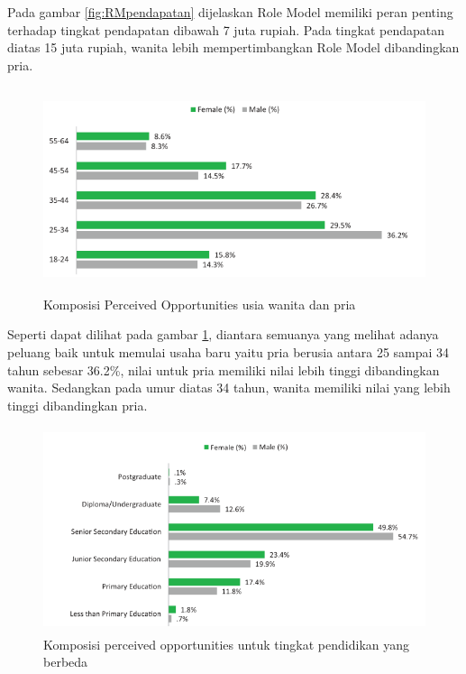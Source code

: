 Pada gambar \ref{fig:RMpendapatan} dijelaskan Role Model memiliki peran penting terhadap tingkat pendapatan dibawah 7 juta rupiah. Pada tingkat pendapatan diatas 15 juta rupiah, wanita lebih mempertimbangkan Role Model dibandingkan pria.

\begin{figure} [H]
	\centering  
	\includegraphics[width=12cm, height=6cm]{umurPO2013} 
	\caption[Komposisi Perceived Opportunities usia wanita dan pria]{Komposisi Perceived Opportunities usia wanita dan pria} 
	\label{fig:POUmur} 
\end{figure} 

Seperti dapat dilihat pada gambar \ref{fig:POUmur}, diantara semuanya yang melihat adanya peluang baik untuk memulai usaha baru yaitu pria berusia antara 25 sampai 34 tahun sebesar 36.2\%, nilai untuk pria memiliki nilai lebih tinggi dibandingkan wanita. Sedangkan pada umur diatas 34 tahun, wanita memiliki nilai yang lebih tinggi dibandingkan pria.

\begin{figure} [H]
	\centering  
	\includegraphics[width=14cm, height=6cm]{pendidikanPO2013} 
	\caption[Komposisi perceived opportunities untuk tingkat pendidikan yang berbeda]{Komposisi perceived opportunities untuk tingkat pendidikan yang berbeda} 
	\label{fig:POpendidikan} 
\end{figure}  

